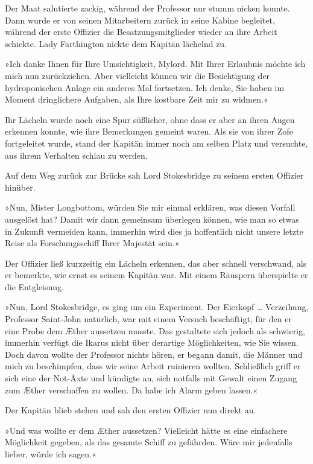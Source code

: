 Der Maat salutierte zackig, während der Professor nur stumm nicken
konnte. Dann wurde er von seinen Mitarbeitern zurück in seine
Kabine begleitet, während der erste Offizier die
Besatzungsmitglieder wieder an ihre Arbeit schickte. Lady
Farthington nickte dem Kapitän lächelnd zu.

»Ich danke Ihnen für Ihre Umsichtigkeit, Mylord. Mit Ihrer
Erlaubnis möchte ich mich nun zurückziehen. Aber vielleicht können
wir die Besichtigung der hydroponischen Anlage ein anderes Mal
fortsetzen. Ich denke, Sie haben im Moment dringlichere Aufgaben,
als Ihre kostbare Zeit mir zu widmen.«

Ihr Lächeln wurde noch eine Spur süßlicher, ohne dass er aber an
ihren Augen erkennen konnte, wie ihre Bemerkungen gemeint waren.
Als sie von ihrer Zofe fortgeleitet wurde, stand der Kapitän immer
noch am selben Platz und versuchte, aus ihrem Verhalten schlau zu
werden.

\bigpar

Auf dem Weg zurück zur Brücke sah Lord Stokesbridge zu seinem
ersten Offizier hinüber.

»Nun, Mister Longbottom, würden Sie mir einmal erklären, was diesen
Vorfall ausgelöst hat? Damit wir dann gemeinsam überlegen können,
wie man so etwas in Zukunft vermeiden kann, immerhin wird dies ja
hoffentlich nicht unsere letzte Reise als Forschungsschiff Ihrer
Majestät sein.«

Der Offizier ließ kurzzeitig ein Lächeln erkennen, das aber schnell
verschwand, als er bemerkte, wie ernst es seinem Kapitän war. Mit
einem Räuspern überspielte er die Entgleisung.

»Nun, Lord Stokesbridge, es ging um ein Experiment. Der Eierkopf
\ldots{} Verzeihung, Professor Saint-John natürlich, war mit einem
Versuch beschäftigt, für den er eine Probe dem Æther aussetzen
musste. Das gestaltete sich jedoch als schwierig, immerhin verfügt
die Ikarus nicht über derartige Möglichkeiten, wie Sie wissen. Doch
davon wollte der Professor nichts hören, er begann damit, die
Männer und mich zu beschimpfen, dass wir seine Arbeit ruinieren
wollten. Schließlich griff er sich eine der Not-Äxte und kündigte
an, sich notfalls mit Gewalt einen Zugang zum Æther verschaffen zu
wollen. Da habe ich Alarm geben lassen.«

Der Kapitän blieb stehen und sah den ersten Offizier nun direkt
an.

»Und was wollte er dem Æther aussetzen? Vielleicht hätte es eine
einfachere Möglichkeit gegeben, als das gesamte Schiff zu
gefährden. Wäre mir jedenfalls lieber, würde ich sagen.«

